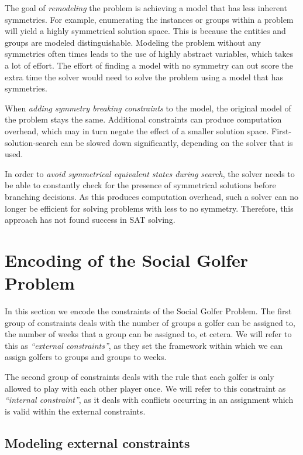 \documentclass[a4paper]{scrartcl}
\begin{document}
The goal of \emph{remodeling} the problem is achieving a model that has less inherent symmetries. For example, enumerating the instances or groups within a problem will yield a highly symmetrical solution space. This is because the entities and groups are modeled distinguishable. Modeling the problem without any symmetries often times leads to the use of highly abstract variables, which takes a lot of effort. The effort of finding a model with no symmetry can out score the extra time the solver would need to solve the problem using a model that has symmetries.

When \emph{adding symmetry breaking constraints} to the model, the original model of the problem stays the same. Additional constraints can produce computation overhead, which may in turn negate the effect of a smaller solution space. First-solution-search can be slowed down significantly, depending on the solver that is used\cite{Prestwich}.

In order to \emph{avoid symmetrical equivalent states during search}, the solver needs to be able to constantly check for the presence of symmetrical solutions before branching decisions. As this produces computation overhead, such a solver can no longer be efficient for solving problems with less to no symmetry. Therefore, this approach has not found success in SAT solving.

\section{Encoding of the Social Golfer Problem}

In this section we encode the constraints of the Social Golfer Problem. The first group of constraints deals with the number of groups a golfer can be assigned to, the number of weeks that a group can be assigned to, et cetera. We will refer to this as \emph{``external constraints''}, as they set the framework within which we can assign golfers to groups and groups to weeks.

The second group of constraints deals with the rule that each golfer is only allowed to play with each other player once. We will refer to this constraint as \emph{``internal constraint''}, as it deals with conflicts occurring in an assignment which is valid within the external constraints.


\subsection{Modeling external constraints}
\end{document}

